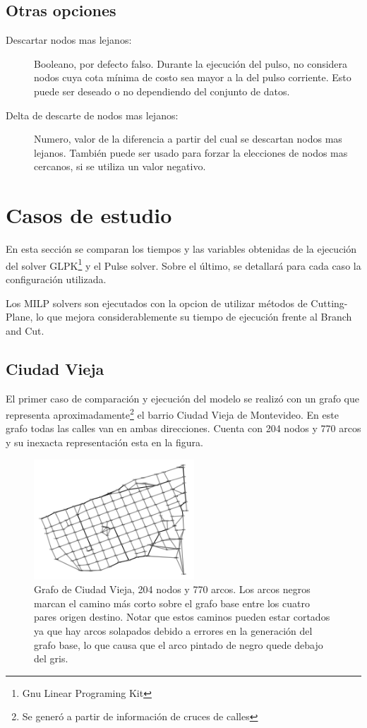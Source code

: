 \documentclass{article}
\begin{document}
  \subsection*{Otras opciones}

  \begin{description}
    \item[Descartar nodos mas lejanos:] Booleano, por defecto falso. Durante la ejecución del pulso, no considera nodos cuya cota mínima de costo sea mayor a la del pulso corriente. Esto puede ser deseado o no dependiendo del conjunto de datos.
    \item[Delta de descarte de nodos mas lejanos:] Numero, valor de la diferencia a partir del cual se descartan nodos mas lejanos. También puede ser usado para forzar la elecciones de nodos mas cercanos, si se utiliza un valor negativo.
  \end{description}

  \section*{Casos de estudio}

  En esta sección se comparan los tiempos y las variables obtenidas de la ejecución del solver GLPK\footnote{Gnu Linear Programing Kit} y el Pulse solver. Sobre el último, se detallará para cada caso la configuración utilizada.

  Los MILP solvers son ejecutados con la opcion de utilizar métodos de Cutting-Plane, lo que mejora considerablemente su tiempo de ejecución frente al Branch and Cut.

  \subsection*{Ciudad Vieja}

  El primer caso de comparación y ejecución del modelo se realizó con un grafo que representa aproximadamente\footnote{Se generó a partir de información de cruces de calles} el barrio Ciudad Vieja de Montevideo. En este grafo todas las calles van en ambas direcciones. Cuenta con 204 nodos y 770 arcos y su inexacta representación esta en la figura.

  \begin{figure}[h!]
    \centering
    \includegraphics[width=6cm]{imgs/mdeo_med_base.png}
    \caption{Grafo de Ciudad Vieja, 204 nodos y 770 arcos. Los arcos negros marcan el camino más corto sobre el grafo base entre los cuatro pares origen destino. Notar que estos caminos pueden estar cortados ya que hay arcos solapados debido a errores en la generación del grafo base, lo que causa que el arco pintado de negro quede debajo del gris.}
    \label{ciudadvieja}
  \end{figure}
\end{document}
